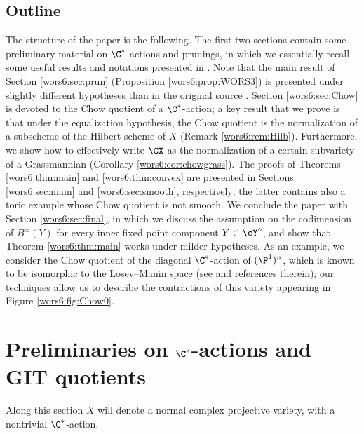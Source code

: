 \documentclass[reqno]{amsproc}
\theoremstyle{definition}
\begin{document}
\subsection*{Outline} The structure of the paper is the following. The first two sections contain some preliminary material on $\C^*$-actions and prunings, in which we essentially recall some useful results and notations presented in \cite{wors6-WORS3,wors6-BRUS}. Note that the main result of Section \ref{wors6:sec:prun} (Proposition \ref{wors6:prop:WORS3}) is presented under slightly different hypotheses than in the original source \cite{wors6-WORS3}. Section \ref{wors6:sec:Chow} is devoted to the Chow quotient of a $\C^*$-action; a key result that we prove is that under the equalization hypothesis, the Chow quotient is the normalization of a subscheme of the Hilbert scheme of $X$ (Remark \ref{wors6:rem:Hilb}). Furthermore, we show how to effectively write $\CX$ as the normalization of a certain subvariety of a Grassmannian (Corollary \ref{wors6:cor:chowgrass}). The proofs of Theorems \ref{wors6:thm:main} and \ref{wors6:thm:convex} are presented in Sections \ref{wors6:sec:main} and \ref{wors6:sec:smooth}, respectively; the latter contains also a toric example whose Chow quotient is not smooth. We conclude the paper with Section \ref{wors6:sec:final}, in which we discuss the assumption on the codimension of $B^\pm(Y)$ for every inner fixed point component $Y\in\cY^\circ$, and show that Theorem \ref{wors6:thm:main} works under milder hypotheses. As an example, we consider the Chow quotient of the diagonal $\C^*$-action of $(\P^1)^n$, which is known to be isomorphic to the Losev--Manin space (see \cite{wors6-DRS} and references therein); our techniques allow us to describe the contractions of this variety appearing in Figure \ref{wors6:fig:Chow0}.




\section{Preliminaries on $\C^*$-actions and GIT quotients}\label{wors6:sec:prelim}


Along this section $X$ will denote a normal complex projective variety, with a nontrivial $\C^*$-action. 

\end{document}
